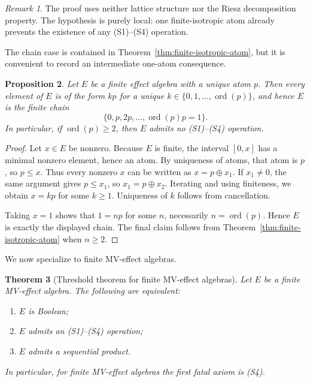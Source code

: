 \documentclass[11pt]{article}
\newtheorem{theorem}{Theorem}[section]
\newtheorem{proposition}[theorem]{Proposition}
\theoremstyle{definition}
\theoremstyle{remark}
\newtheorem{remark}[theorem]{Remark}
\numberwithin{equation}{section}
\newcommand{\op}{\oplus}
\newcommand{\ord}{\operatorname{ord}}
\begin{document}
\begin{remark}
The proof uses neither lattice structure nor the Riesz decomposition property. The hypothesis is purely local: one finite-isotropic atom already prevents the existence of any \textup{(S1)}--\textup{(S4)} operation.
\end{remark}

The chain case is contained in Theorem~\ref{thm:finite-isotropic-atom}, but it is convenient to record an intermediate one-atom consequence.

\begin{proposition}\label{prop:one-atom-chain}
Let $E$ be a finite effect algebra with a unique atom $p$. Then every element of $E$ is of the form $kp$ for a unique $k\in\{0,1,\dots,\ord(p)\}$, and hence $E$ is the finite chain
\[
\{0,p,2p,\dots,\ord(p)p=1\}.
\]
In particular, if $\ord(p)\ge 2$, then $E$ admits no \textup{(S1)}--\textup{(S4)} operation.
\end{proposition}

\begin{proof}
Let $x\in E$ be nonzero. Because $E$ is finite, the interval $[0,x]$ has a minimal nonzero element, hence an atom. By uniqueness of atoms, that atom is $p$, so $p\le x$. Thus every nonzero $x$ can be written as $x=p\op x_1$. If $x_1\neq 0$, the same argument gives $p\le x_1$, so $x_1=p\op x_2$. Iterating and using finiteness, we obtain $x=kp$ for some $k\ge 1$. Uniqueness of $k$ follows from cancellation.

Taking $x=1$ shows that $1=np$ for some $n$, necessarily $n=\ord(p)$. Hence $E$ is exactly the displayed chain. The final claim follows from Theorem~\ref{thm:finite-isotropic-atom} when $n\ge 2$.
\end{proof}

We now specialize to finite MV-effect algebras.

\begin{theorem}[Threshold theorem for finite MV-effect algebras]\label{thm:finite-mv-threshold}
Let $E$ be a finite MV-effect algebra. The following are equivalent:
\begin{enumerate}[label=\textup{(\roman*)},leftmargin=2.7em]
    \item $E$ is Boolean;
    \item $E$ admits an \textup{(S1)}--\textup{(S4)} operation;
    \item $E$ admits a sequential product.
\end{enumerate}
In particular, for finite MV-effect algebras the first fatal axiom is \textup{(S4)}.
\end{theorem}
\end{document}
